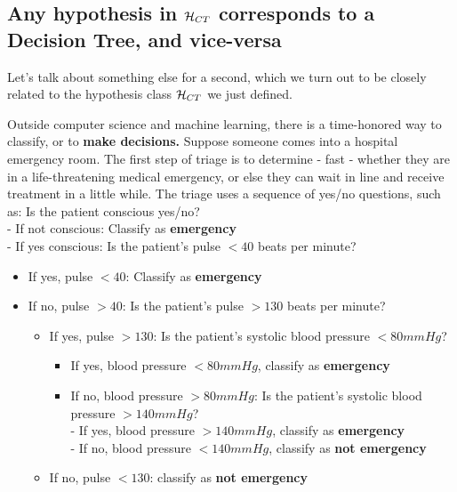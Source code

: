 \begin{itemize}
     \subsection{Any hypothesis in $\mathcal{H}_{CT}$ corresponds to a Decision Tree,
     and vice-versa}
    
     Let's talk about something else for a second, which we turn out to be
     closely related to the hypothesis class $\mathcal{H}_{CT}$ we just defined.

     Outside computer science and machine learning, there is a time-honored way
     to classify, or to {\bf make decisions.} Suppose someone comes into a
     hospital emergency room. The first step of triage is to determine - fast - whether
     they are in a life-threatening medical emergency, or else they can wait in
     line and receive treatment in a little while. The triage uses a sequence of
     yes/no questions, such as: 
       Is the patient conscious yes/no? \\
	   - If not conscious: Classify as {\bf emergency}\\
	   - If yes conscious: Is the patient's pulse $<40$ beats per
	     minute?
	     \begin{itemize}
	       \item If yes, pulse $<40$: Classify as {\bf emergency} 
	       \item If no, pulse $>40$: Is the patient's pulse $>130$ beats per
		 minute?
		\begin{itemize}
	       \item If yes, pulse $>130$: Is the patient's systolic blood
		 pressure $<80 mm Hg$?
		 \begin{itemize}
		   \item If yes, blood pressure $<80 mm Hg$,  classify as {\bf
		     emergency} 
		   \item If no, blood pressure $>80 mm Hg$: Is the patient's systolic blood
		 pressure $>140 mm Hg$?\\
		 - If yes, blood pressure $>140 mm Hg$, classify as {\bf
		     emergency} \\
		 - If no, blood pressure $<140 mm Hg$, classify as {\bf
		     not emergency} 
	     \end{itemize}

	       \item If no, pulse $<130$: classify as {\bf not emergency}
	     \end{itemize}
	     \end{itemize}
 \end{itemize}


